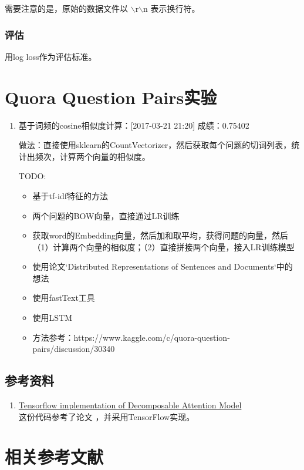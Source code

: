 需要注意的是，原始的数据文件以 $\backslash$r$\backslash$n 表示换行符。

\subsubsection{评估}
用log loss作为评估标准。

\section{Quora Question Pairs实验}

\begin{enumerate}
\item 基于词频的cosine相似度计算：[2017-03-21 21:20]
成绩：0.75402

做法：直接使用sklearn的CountVectorizer，然后获取每个问题的切词列表，统计出频次，计算两个向量的相似度。

TODO: 
\begin{itemize}
\item 基于tf-idf特征的方法
\item 两个问题的BOW向量，直接通过LR训练
\item 获取word的Embedding向量，然后加和取平均，获得问题的向量，然后（1）计算两个向量的相似度；（2）直接拼接两个向量，接入LR训练模型
\item 使用论文`Distributed Representations of Sentences and Documents`中的想法
\item 使用fastText工具
\item 使用LSTM
\item 方法参考：https://www.kaggle.com/c/quora-question-pairs/discussion/30340
\end{itemize}



\end{enumerate}

\subsection{参考资料}

\begin{enumerate}
    \item \href{https://github.com/siarez/sentence_pair_classifier}{Tensorflow implementation of Decomposable Attention Model} \\
        这份代码参考了论文 \cite{Parikh:2016aa}，并采用TensorFlow实现。

\end{enumerate}


\section{相关参考文献}

\ifx\projectsnotes\undefined
    
\fi
